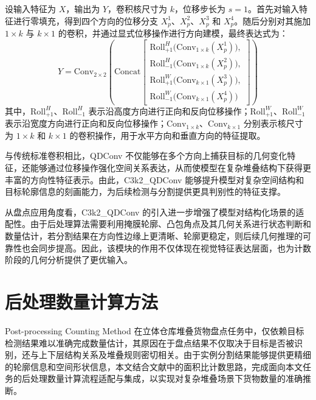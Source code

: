 设输入特征为 $X$，输出为 $Y$，卷积核尺寸为 $k$，位移步长为 $s=1$。首先对输入特征进行零填充，得到四个方向的位移分支 $X_p^1$、$X_p^2$、$X_p^3$ 和 $X_p^4$。随后分别对其施加 $1\times k$ 与 $k\times 1$ 的卷积，并通过显式位移操作进行方向建模，最终表达式为：
\begin{equation}\label{eq:qdconv}
Y = \mathrm{Conv}_{2\times 2}\left(
\mathrm{Concat}\left[
\begin{array}{l}
\mathrm{Roll}_{+1}^{H}\bigl(\mathrm{Conv}_{1\times k}(X_p^1)\bigr),\\
\mathrm{Roll}_{-1}^{H}\bigl(\mathrm{Conv}_{1\times k}(X_p^2)\bigr),\\
\mathrm{Roll}_{+1}^{W}\bigl(\mathrm{Conv}_{k\times 1}(X_p^3)\bigr),\\
\mathrm{Roll}_{-1}^{W}\bigl(\mathrm{Conv}_{k\times 1}(X_p^4)\bigr)
\end{array}
\right]
\right)
\end{equation}
其中，$\mathrm{Roll}_{+1}^{H}$、$\mathrm{Roll}_{-1}^{H}$ 表示沿高度方向进行正向和反向位移操作；$\mathrm{Roll}_{+1}^{W}$、$\mathrm{Roll}_{-1}^{W}$ 表示沿宽度方向进行正向和反向位移操作；$\mathrm{Conv}_{1\times k}$、$\mathrm{Conv}_{k\times 1}$ 分别表示核尺寸为 $1\times k$ 和 $k\times 1$ 的卷积操作，用于水平方向和垂直方向的特征提取。

与传统标准卷积相比，QDConv 不仅能够在多个方向上捕获目标的几何变化特征，还能够通过位移操作强化空间关系表达，从而使模型在复杂堆叠结构下获得更丰富的方向性特征表示。由此，C3k2\_QDConv 能够提升模型对复杂空间结构和目标轮廓信息的刻画能力，为后续检测与分割提供更具判别性的特征支撑。

从盘点应用角度看，C3k2\_QDConv 的引入进一步增强了模型对结构化场景的适配性。由于后处理算法需要利用掩膜轮廓、凸包角点及其几何关系进行状态判断和数量估计，若分割结果在方向性边缘上更清晰、轮廓更稳定，则后续几何推理的可靠性也会同步提高。因此，该模块的作用不仅体现在视觉特征表达层面，也为计数阶段的几何分析提供了更优输入。

\section{后处理数量计算方法}{Post-processing Counting Method}
在立体仓库堆叠货物盘点任务中，仅依赖目标检测结果难以准确完成数量估计，其原因在于盘点结果不仅取决于目标是否被识别，还与上下层结构关系及堆叠规则密切相关。由于实例分割结果能够提供更精细的轮廓信息和空间形状信息，本文结合文献\cite{hu2025area}中的面积比计数思路，完成面向本文任务的后处理数量计算流程适配与集成，以实现对复杂堆叠场景下货物数量的准确推断。

